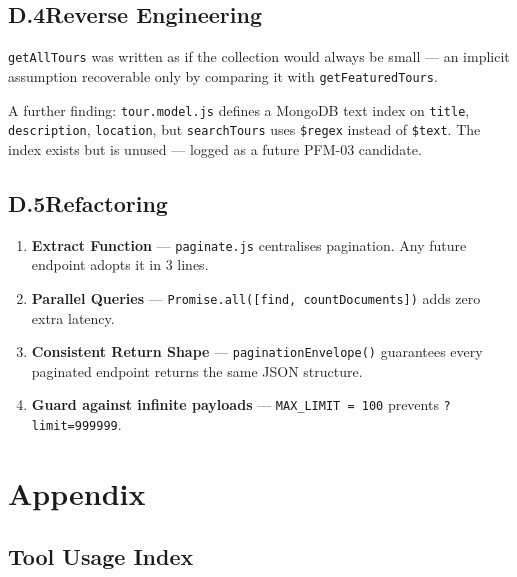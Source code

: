 \documentclass[11pt,a4paper]{article}
\begin{document}
\subsection{D.4\quad Reverse Engineering}

\texttt{getAllTours} was written as if the collection would always be small --- an
implicit assumption recoverable only by comparing it with \texttt{getFeaturedTours}.

A further finding: \texttt{tour.model.js} defines a MongoDB text index on
\texttt{title}, \texttt{description}, \texttt{location}, but \texttt{searchTours}
uses \texttt{\$regex} instead of \texttt{\$text}.
The index exists but is unused --- logged as a future PFM-03 candidate.

\subsection{D.5\quad Refactoring}

\begin{enumerate}
  \item \textbf{Extract Function} --- \texttt{paginate.js} centralises pagination.
        Any future endpoint adopts it in 3 lines.
  \item \textbf{Parallel Queries} ---
        \texttt{Promise.all([find,\ countDocuments])} adds zero extra latency.
  \item \textbf{Consistent Return Shape} --- \texttt{paginationEnvelope()} guarantees
        every paginated endpoint returns the same JSON structure.
  \item \textbf{Guard against infinite payloads} ---
        \texttt{MAX\_LIMIT = 100} prevents \texttt{?limit=999999}.
\end{enumerate}

\newpage
\section*{Appendix}

\subsection*{Tool Usage Index}
\end{document}
